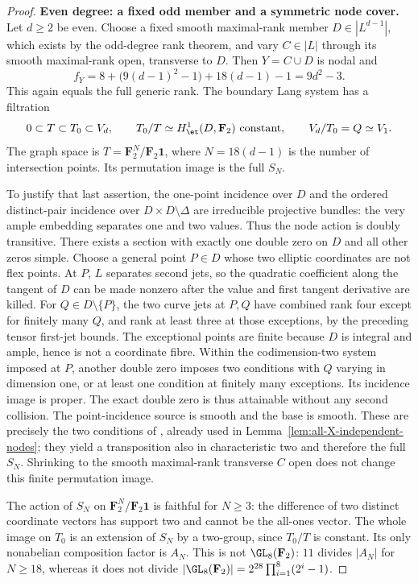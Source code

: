 \begin{proof}
\par\smallskip\noindent\textbf{Even degree: a fixed odd member and a symmetric node cover.}
Let $d\ge2$ be even. Choose a fixed smooth maximal-rank member
$D\in|L^{d-1}|$, which exists by the odd-degree rank theorem, and
vary $C\in|L|$ through its smooth maximal-rank open, transverse to $D$.
Then $Y=C\cup D$ is nodal and
\[
 f_Y=8+\bigl(9(d-1)^2-1\bigr)+18(d-1)-1=9d^2-3.
\]
This again equals the full generic rank. The boundary Lang system has
a filtration
\[
 0\subset T\subset T_0\subset V_d,
 \qquad T_0/T\simeq H^1_{\et}(D,\mathbf F_2)\text{ constant},
 \qquad V_d/T_0=Q\simeq V_1.
\]
The graph space is $T=\mathbf F_2^N/\mathbf F_2\mathbf 1$,
where $N=18(d-1)$ is the number of intersection points.
Its permutation image is the full $S_N$.

To justify that last assertion, the one-point incidence over $D$ and
the ordered distinct-pair incidence over $D\times D\setminus\Delta$
are irreducible projective bundles: the very ample embedding separates
one and two values. Thus the node action is doubly transitive.
There exists a section with exactly one double zero on $D$ and all
other zeros simple. Choose a general point $P\in D$ whose two
elliptic coordinates are not flex points. At $P$, $L$ separates
second jets, so the quadratic coefficient along the tangent of $D$
can be made nonzero after the value and first tangent derivative
are killed. For $Q\in D\setminus\{P\}$, the two curve jets at
$P,Q$ have combined rank four except for finitely many $Q$, and
rank at least three at those exceptions, by the preceding tensor
first-jet bounds. The exceptional points are finite because $D$ is
integral and ample, hence is not a coordinate fibre. Within the
codimension-two system imposed at $P$, another double zero imposes
two conditions with $Q$ varying in dimension one, or at least one
condition at finitely many exceptions. Its incidence image is proper.
The exact double zero is thus attainable without any second collision.
The point-incidence source is smooth and the base is smooth.
These are precisely the two conditions of
\cite[Proposition~3.1, arXiv version~3, pp.~7--8]{Entin2021}, already
used in Lemma~\ref{lem:all-X-independent-nodes}; they yield a
transposition also in characteristic two and therefore the full $S_N$.
Shrinking to the smooth maximal-rank transverse $C$ open does not
change this finite permutation image.

The action of $S_N$ on $\mathbf F_2^N/\mathbf F_2\mathbf1$ is
faithful for $N\ge3$: the difference of two distinct coordinate
vectors has support two and cannot be the all-ones vector.
The whole image on $T_0$ is an extension of $S_N$ by a two-group,
since $T_0/T$ is constant. Its only nonabelian composition factor
is $A_N$. This is not $\GL_8(\mathbf F_2)$: $11$ divides $|A_N|$
for $N\ge18$, whereas it does not divide
$|\GL_8(\mathbf F_2)|=2^{28}\prod_{i=1}^8(2^i-1)$.


\end{proof}
